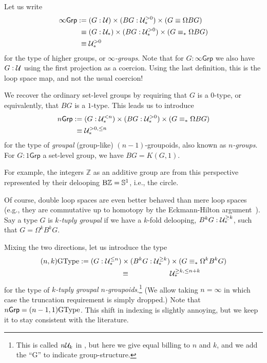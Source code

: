 Let us write
\begin{align*}
  \infty\mathsf{Grp}
  &:= (G : \mathcal{U}) \times (BG : \mathcal{U}_\ast^{>0}) \times (G \equiv \Omega BG) \\
  &\phantom{:}\equiv (G : \mathcal{U}_\ast) \times (BG : \mathcal{U}_\ast^{>0}) \times (G \equiv_\ast \Omega BG) \\
  &\phantom{:}\equiv \mathcal{U}_\ast^{>0}
\end{align*}
for the type of higher groups, or \emph{$\infty$-groups}.
Note that for $G:\infty\mathsf{Grp}$
we also have $G:\mathcal{U}$ using the first projection as a coercion. Using
the last definition, this is the loop space map, and not the usual coercion!

We recover the ordinary set-level
groups by requiring that $G$ is a $0$-type, or equivalently, that $BG$
is a $1$-type. This leads us to introduce
\begin{align*}
  n\mathsf{Grp}
  &:= (G : \mathcal{U}_\ast^{<n}) \times (BG : \mathcal{U}_\ast^{>0})
    \times (G \equiv_\ast \Omega BG) \\
  &\phantom{:}\equiv \mathcal{U}_\ast^{>0,\le n}
\end{align*}
for the type of \emph{groupal} (group-like) $(n-1)$-groupoids, also known
as \emph{$n$-groups}. For $G:1\mathsf{Grp}$
a set-level group, we have $BG = K(G,1)$.

For example, the integers $\mathbb{Z}$ as an additive group are from this
perspective represented by their delooping $\mathop{\mathrm{B}\mathbb{Z}}={\mathbb{S}}^1$, i.e., the circle.

Of course, double loop spaces are even better behaved than mere loop
spaces (e.g., they are commutative up to homotopy
by the Eckmann-Hilton argument~\cite[Theorem~2.1.6]{hottbook}).
Say a type $G$ is
\emph{$k$-tuply groupal} if we have a $k$-fold delooping,
$B^kG : \mathcal{U}_\ast^{\ge k}$, such that $G = \Omega^kB^kG$.

Mixing the two directions, let us introduce the type
\begin{align*}
  (n,k)\GType
  &:= (G : \UU_\pt^{\le n}) \times (B^kG : \UU_\pt^{\ge k})
    \times (G \equiv_\pt \Omega^kB^kG) \\
  &\omit$\phantom{:}\equiv \UU_\pt^{\ge k,\le n+k}$
\end{align*}
for the type of \emph{$k$-tuply groupal $n$-groupoids}.\footnote{This
  is called $n\mathcal{U}_k$ in \cite{BaezDolan1998}, but here we give equal
  billing to $n$ and $k$,
  and we add the ``G'' to indicate group-structure.}
(We allow taking $n=\infty$ in which case the truncation requirement
is simply dropped.)
Note that $n\mathsf{Grp} = (n-1,1)\mathrm{GType}$. This shift in indexing is slightly
annoying, but we keep it to stay consistent with the literature.

